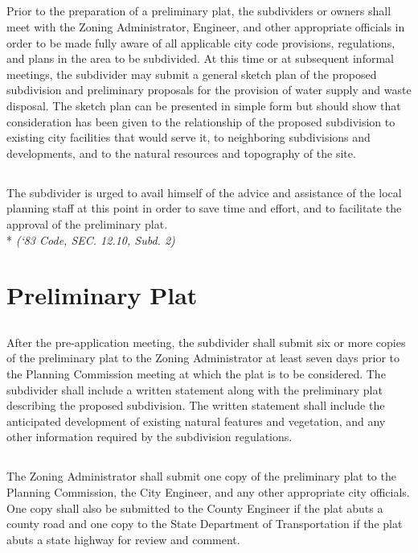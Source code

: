\subsection{}
Prior to the preparation of a preliminary plat, the subdividers or owners shall meet with the Zoning Administrator, Engineer, and other appropriate officials in order to be made fully aware of all applicable city code provisions, regulations, and plans in the area to be subdivided. At this time or at subsequent informal meetings, the subdivider may submit a general sketch plan of the proposed subdivision and preliminary proposals for the provision of water supply and waste disposal. The sketch plan can be presented in simple form but should show that consideration has been given to the relationship of the proposed subdivision to existing city facilities that would serve it, to neighboring subdivisions and developments, and to the natural resources and topography of the site.
\subsection{}
 The subdivider is urged to avail himself of the advice and assistance of the local planning staff at this point in order to save time and effort, and to facilitate the approval of the preliminary plat.\\*
 \emph{(‘83 Code, SEC. 12.10, Subd. 2)}
\section{Preliminary Plat}
\subsection{}
After the pre-application meeting, the subdivider shall submit six or more copies of the preliminary plat to the Zoning Administrator at least seven days prior to the Planning Commission meeting at which the plat is to be considered. The subdivider shall include a written statement along with the preliminary plat describing the proposed subdivision. The written statement shall include the anticipated development of existing natural features and vegetation, and any other information required by the subdivision regulations.
\subsection{}
The Zoning Administrator shall submit one copy of the preliminary plat to the Planning Commission, the City Engineer, and any other appropriate city officials. One copy shall also be submitted to the County Engineer if the plat abuts a county road and one copy to the State Department of Transportation if the plat abuts a state highway for review and comment.
